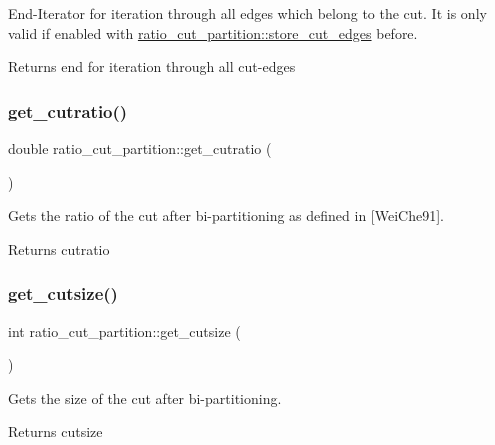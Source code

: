 End-\/\+Iterator for iteration through all edges which belong to the cut. It is only valid if enabled with \mbox{\hyperlink{classratio__cut__partition_af5a76fa0ecaf2c75792cc2c1574994c7}{ratio\+\_\+cut\+\_\+partition\+::store\+\_\+cut\+\_\+edges}} before.

\begin{DoxyReturn}{Returns}
end for iteration through all cut-\/edges 
\end{DoxyReturn}
\mbox{\label{classratio__cut__partition_a9a61b2be36953d57e36fbb511cf1aa96}} 
\subsubsection{\texorpdfstring{get\+\_\+cutratio()}{get\_cutratio()}}
{\footnotesize\ttfamily double ratio\+\_\+cut\+\_\+partition\+::get\+\_\+cutratio (\begin{DoxyParamCaption}{ }\end{DoxyParamCaption})}

Gets the ratio of the cut after bi-\/partitioning as defined in \mbox{[}Wei\+Che91\mbox{]}.

\begin{DoxyReturn}{Returns}
cutratio 
\end{DoxyReturn}
\mbox{\label{classratio__cut__partition_a4fc9beab107546850974ffd5a47c1e7f}} 
\subsubsection{\texorpdfstring{get\+\_\+cutsize()}{get\_cutsize()}}
{\footnotesize\ttfamily int ratio\+\_\+cut\+\_\+partition\+::get\+\_\+cutsize (\begin{DoxyParamCaption}{ }\end{DoxyParamCaption})}

Gets the size of the cut after bi-\/partitioning.

\begin{DoxyReturn}{Returns}
cutsize 
\end{DoxyReturn}
\mbox{\label{classratio__cut__partition_a3b0a7dcc26c9ca25016abf2cebf250fe}} 

